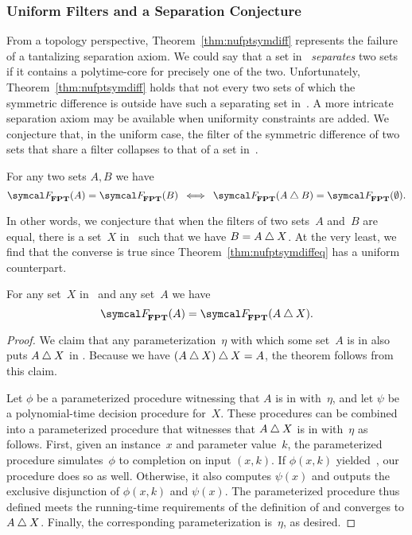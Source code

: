 \subsubsection{Uniform Filters and a Separation Conjecture}
From a topology perspective, Theorem~\ref{thm:nufptsymdiff} represents the failure of a tantalizing separation axiom.
We could say that a set in~ \emph{separates} two sets if it contains a polytime-core for precisely one of the two.
Unfortunately, Theorem~\ref{thm:nufptsymdiff} holds that not every two sets of which the symmetric difference is outside  have such a separating set in~.
A more intricate separation axiom may be available when uniformity constraints are added.
We conjecture that, in the uniform case, the filter of the symmetric difference of two sets that share a filter collapses to that of a set in~.
\begin{conjecture}
\label{con:fptsymdiff}%
  For any two sets $A, B$ we have
  \begin{equation*}
    \calF_\cl{FPT}(A) = \calF_\cl{FPT}(B) \:\iff\: \calF_\cl{FPT}(A \symdiff B) = \calF_\cl{FPT}(\emptyset).
  \end{equation*}
\end{conjecture}

In other words, we conjecture that when the filters of two sets~$A$ and~$B$ are equal, there is a set~$X$ in~ such that we have $B = A \bigtriangleup X$.
At the very least, we find that the converse is true since Theorem~\ref{thm:nufptsymdiffeq} has a uniform counterpart.
\begin{theorem}
  For any set~$X$ in~ and any set~$A$ we have
  \begin{equation*}
    \calF_\cl{FPT}(A) = \calF_\cl{FPT}(A \symdiff X).
  \end{equation*}
\end{theorem}
\begin{proof}
  We claim that any parameterization~$\eta$ with which some set~$A$ is in  also puts $A \bigtriangleup X$ in .
  Because we have $(A \bigtriangleup X) \bigtriangleup X = A$, the theorem follows from this claim.

  Let $\phi$ be a parameterized procedure witnessing that $A$ is in  with~$\eta$, and let $\psi$ be a polynomial-time decision procedure for~$X$.
  These procedures can be combined into a parameterized procedure that witnesses that $A \bigtriangleup X$ is in  with~$\eta$ as follows.
  First, given an instance~$x$ and parameter value~$k$, the parameterized procedure simulates~$\phi$ to completion on input $(x, k)$.
  If $\phi(x, k)$ yielded~, our procedure does so as well.
  Otherwise, it also computes $\psi(x)$ and outputs the exclusive disjunction of $\phi(x, k)$ and $\psi(x)$.
  The parameterized procedure thus defined meets the running-time requirements of the definition of  and converges to $A \bigtriangleup X$.
  Finally, the corresponding parameterization is~$\eta$, as desired.
\end{proof}

